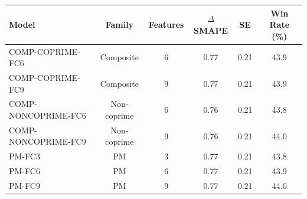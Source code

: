 \begin{tabular}{@{}lccccc@{}}
\toprule
Model & Family & Features & $\Delta$SMAPE & SE & Win Rate (\%) \\
\midrule
COMP-COPRIME-FC6 & Composite & 6 & 0.77 & 0.21 & 43.9 \\
COMP-COPRIME-FC9 & Composite & 9 & 0.77 & 0.21 & 43.9 \\
COMP-NONCOPRIME-FC6 & Non-coprime & 6 & 0.76 & 0.21 & 43.8 \\
COMP-NONCOPRIME-FC9 & Non-coprime & 9 & 0.76 & 0.21 & 44.0 \\
PM-FC3 & PM & 3 & 0.77 & 0.21 & 43.8 \\
PM-FC6 & PM & 6 & 0.77 & 0.21 & 43.9 \\
PM-FC9 & PM & 9 & 0.77 & 0.21 & 44.0 \\
\bottomrule
\end{tabular}
